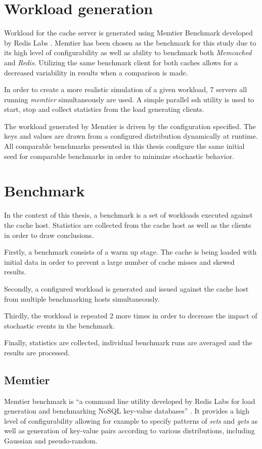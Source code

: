 \section{Workload generation}
\label{methodology:workload-gen}
Workload for the cache server is generated using Memtier Benchmark developed by Redis Labs \cite{memtier}. Memtier has been chosen as the benchmark for this study due to its high level of configurability as well as ability to benchmark both \textit{Memcached} and \textit{Redis}. Utilizing the same benchmark client for both caches allows for a decreased variability in results when a comparison is made.

In order to create a more realistic simulation of a given workload, 7 servers all running \textit{memtier} simultaneously are used. A simple parallel ssh utility is used to start, stop and collect statistics from the load generating clients.

The workload generated by Memtier is driven by the configuration specified. The keys and values are drawn from a configured distribution dynamically at runtime. All comparable benchmarks presented in this thesis configure the same initial seed for comparable benchmarks in order to minimize stochastic behavior.

\section{Benchmark}

In the context of this thesis, a benchmark is a set of workloads executed against the cache host. Statistics are collected from the cache host as well as the clients in order to draw conclusions.

Firstly, a benchmark consists of a warm up stage. The cache is being loaded with initial data in order to prevent a large number of cache misses and skewed results.

Secondly, a configured workload is generated and issued against the cache host from multiple benchmarking hosts simultaneously.

Thirdly, the workload is repeated 2 more times in order to decrease the impact of stochastic events in the benchmark.

Finally, statistics are collected, individual benchmark runs are averaged and the results are processed.



\subsection{Memtier}
Memtier benchmark is ``a command line utility developed by Redis Labs for load generation and benchmarking NoSQL key-value databases'' \cite{memtier}. It provides a high level of configurability allowing for example to specify patterns of \textit{sets} and \textit{gets} as well as generation of key-value pairs according to various distributions, including Gaussian and pseudo-random.

